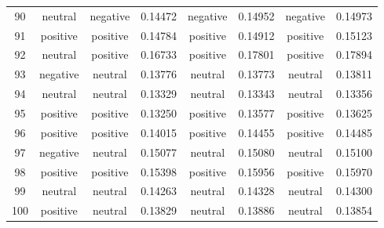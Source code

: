 \begin{center}
\begin{footnotesize}
\begin{longtable}{cc | cc | cc | cc}
90 & neutral & negative & 0.14472 & negative & 0.14952 & negative & 0.14973 \\
91 & positive & positive & 0.14784 & positive & 0.14912 & positive & 0.15123 \\
92 & neutral & positive & 0.16733 & positive & 0.17801 & positive & 0.17894 \\
93 & negative & neutral & 0.13776 & neutral & 0.13773 & neutral & 0.13811 \\
94 & neutral & neutral & 0.13329 & neutral & 0.13343 & neutral & 0.13356 \\
95 & positive & positive & 0.13250 & positive & 0.13577 & positive & 0.13625 \\
96 & positive & positive & 0.14015 & positive & 0.14455 & positive & 0.14485 \\
97 & negative & neutral & 0.15077 & neutral & 0.15080 & neutral & 0.15100 \\
98 & positive & positive & 0.15398 & positive & 0.15956 & positive & 0.15970 \\
99 & neutral & neutral & 0.14263 & neutral & 0.14328 & neutral & 0.14300 \\
100 & positive & neutral & 0.13829 & neutral & 0.13886 & neutral & 0.13854 \\

		\end{longtable}
		\end{footnotesize}
	\end{center}
